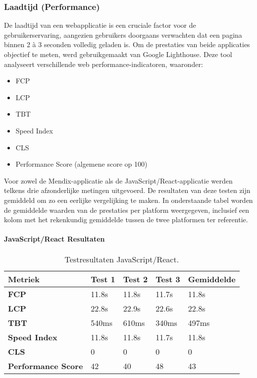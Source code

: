 \subsubsection{Laadtijd (Performance)}
De laadtijd van een webapplicatie is een cruciale factor voor de gebruikerservaring, aangezien gebruikers doorgaans verwachten dat een pagina binnen 2 à 3 seconden volledig geladen is. Om de prestaties van beide applicaties objectief te meten, werd gebruikgemaakt van Google Lighthouse. Deze tool analyseert verschillende web performance-indicatoren, waaronder:
\begin{itemize}
    \item \gls{FCP}
    \item \gls{LCP}
    \item \gls{TBT}
    \item Speed Index
    \item \gls{CLS}
    \item Performance Score (algemene score op 100)
\end{itemize}
Voor zowel de Mendix-applicatie als de JavaScript/React-applicatie werden telkens drie afzonderlijke metingen uitgevoerd. De resultaten van deze testen zijn gemiddeld om zo een eerlijke vergelijking te maken. In onderstaande tabel worden de gemiddelde waarden van de prestaties per platform weergegeven, inclusief een kolom met het rekenkundig gemiddelde tussen de twee platformen ter referentie.


\paragraph{JavaScript/React Resultaten}

\begin{table}[h]
    \centering
    \begin{tabular}{ |p{3cm}|p{2.75cm}|p{2.75cm}|p{2.75cm}|p{2.75cm}|}
        \hline
        \textbf{Metriek} & \textbf{Test 1} & \textbf{Test 2}  & \textbf{Test 3} & \textbf{Gemiddelde}\\
        \hline
        \textbf{\gls{FCP}}  & 11.8s & 11.8s & 11.7s & 11.8s \\
        \hline
        \textbf{\gls{LCP}} & 22.8s & 22.9s & 22.6s & 22.8s\\
        \hline
        \textbf{\gls{TBT}}  & 540ms & 610ms & 340ms & 497ms \\
        \hline
        \textbf{Speed Index}  & 11.8s & 11.8s & 11.7s & 11.8s \\
        \hline
        \textbf{\gls{CLS}}  & 0 & 0  & 0 & 0 \\
        \hline
        \textbf{Performance Score}  & 42 & 40  & 48 & 43 \\
        \hline
    \end{tabular}
    \caption[\centering Testresultaten laadtijd JavaScript/React]{\label{tab:Testresultaten JavaScript/React}Testresultaten JavaScript/React.}
\end{table}

